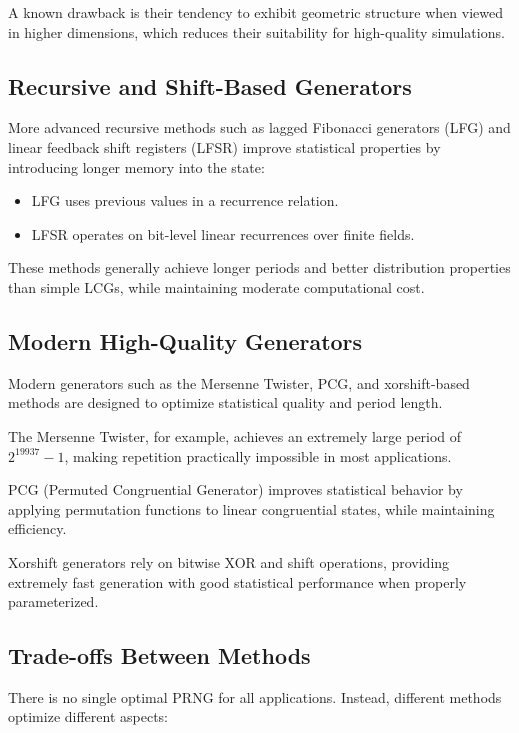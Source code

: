 A known drawback is their tendency to exhibit geometric structure when viewed in higher dimensions, which reduces their suitability for high-quality simulations.

\subsection{Recursive and Shift-Based Generators}

More advanced recursive methods such as lagged Fibonacci generators (LFG) and linear feedback shift registers (LFSR) improve statistical properties by introducing longer memory into the state:

\begin{itemize}
    \item LFG uses previous values in a recurrence relation.
    \item LFSR operates on bit-level linear recurrences over finite fields.
\end{itemize}

These methods generally achieve longer periods and better distribution properties than simple LCGs, while maintaining moderate computational cost.

\subsection{Modern High-Quality Generators}

Modern generators such as the Mersenne Twister, PCG, and xorshift-based methods are designed to optimize statistical quality and period length.

The Mersenne Twister, for example, achieves an extremely large period of $2^{19937}-1$, making repetition practically impossible in most applications.

PCG (Permuted Congruential Generator) improves statistical behavior by applying permutation functions to linear congruential states, while maintaining efficiency.

Xorshift generators rely on bitwise XOR and shift operations, providing extremely fast generation with good statistical performance when properly parameterized.

\subsection{Trade-offs Between Methods}

There is no single optimal PRNG for all applications. Instead, different methods optimize different aspects:

